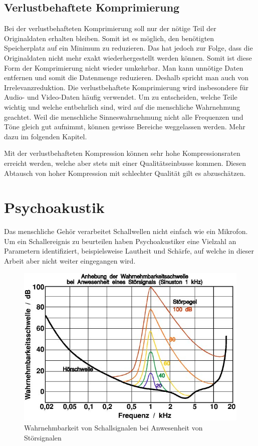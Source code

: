 \begin{refsection}
\subsection{Verlustbehaftete Komprimierung}
Bei der verlustbehafteten Komprimierung soll nur der nötige Teil der Originaldaten erhalten bleiben.
Somit ist es möglich, den benötigten Speicherplatz auf ein Minimum zu reduzieren.
Das hat jedoch zur Folge, dass die Originaldaten nicht mehr exakt wiederhergestellt werden können. 
Somit ist diese Form der Komprimierung nicht wieder umkehrbar.
Man kann unnötige Daten entfernen und somit die Datenmenge reduzieren.
Deshalb spricht man auch von Irrelevanzreduktion.
Die verlustbehaftete Komprimierung wird insbesondere für Audio- und Video-Daten häufig verwendet.
Um zu entscheiden, welche Teile wichtig und welche entbehrlich sind, wird auf die menschliche Wahrnehmung geachtet.
Weil die menschliche Sinneswahrnehmung nicht alle Frequenzen und Töne gleich gut aufnimmt, können gewisse Bereiche weggelassen werden.
Mehr dazu im folgenden Kapitel.

Mit der verlustbehafteten Kompression können sehr hohe Kompressionsraten erreicht werden, welche aber stets mit einer Qualitätseinbusse kommen.
Diesen Abtausch von hoher Kompression mit schlechter Qualität gilt es abzuschätzen.

\section{Psychoakustik}
\label{chapter:Psychoakustik}
Das menschliche Gehör verarbeitet Schallwellen nicht einfach wie ein Mikrofon.
Um ein Schallereignis zu beurteilen haben Psychoakustiker eine Vielzahl an Parametern identifiziert, beispielsweise Lautheit und Schärfe, auf welche in dieser Arbeit aber nicht weiter eingegangen wird.

\begin{figure}
	\centering
	\includegraphics[width=0.6\linewidth]{papers/compress/Bilder/Akustik_Mithoerschwelle2}
	\caption{Wahrnehmbarkeit von Schallsignalen bei Anwesenheit von Störsignalen \cite{skript:Akustik2}}
	\label{fig:Wahrnehmbarkeitsschwelle}
\end{figure}


\end{refsection}
